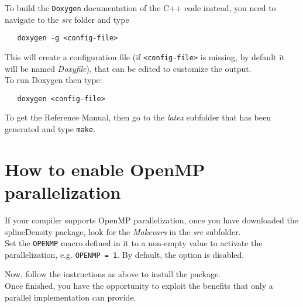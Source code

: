 To build the \verb|Doxygen| documentation of the C++ code instead, you need to navigate to the \textit{src} folder and type 
\begin{verbatim}
   doxygen -g <config-file>
\end{verbatim}
This will create a configuration file (if \verb|<config-file>| is missing, by default it will be named \textit{Doxyfile}), that can be edited to customize the output. \\
To run Doxygen then type:
\begin{verbatim}
   doxygen <config-file>
\end{verbatim}
To get the Reference Manual, then go to the \textit{latex} subfolder that has been generated and type \verb|make|.




\section{How to enable OpenMP parallelization}
If your compiler supports OpenMP parallelization, once you have downloaded the splineDensity package, look for the \textit{Makevars} in the \textit{src} subfolder.\\
Set the \verb|OPENMP| macro defined in it to a non-empty value to activate the parallelization, e.g. \verb|OPENMP = 1|. By default, the option is disabled.

Now, follow the instructions as above to install the package. \\
Once finished, you have the opportunity to exploit the benefits that only a parallel implementation can provide.
